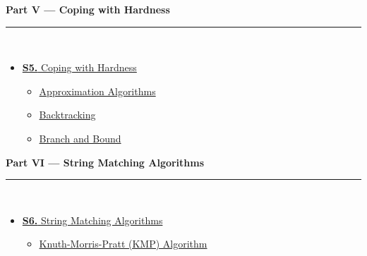 \documentclass[12pt,a3paper]{article}
\begin{document}
\begin{tcolorbox}[breakable,colback=cE!5,colframe=cE,boxrule=1pt,arc=5pt,
  left=8pt,right=8pt,top=8pt,bottom=8pt,before skip=4pt]
  {\large\bfseries\textcolor{cE}{Part V --- Coping with Hardness}}\\[5pt]
  \textcolor{cE!40}{\rule{\textwidth}{0.4pt}}\\[3pt]
  \small\begin{itemize}[leftmargin=1.2em,itemsep=1pt,label={\textcolor{cE}{$\triangleright$}}]
    \item \hyperref[sec:S5]{\textbf{S5.} Coping with Hardness}
      \begin{itemize}[leftmargin=1.5em,itemsep=0pt,label={\textcolor{cE}{$\cdot$}}]
        \item \hyperref[sub:s5-approx]{Approximation Algorithms}
        \item \hyperref[sub:s5-backtrack]{Backtracking}
        \item \hyperref[sub:s5-branchbound]{Branch and Bound}
      \end{itemize}
  \end{itemize}
\end{tcolorbox}

\begin{tcolorbox}[breakable,colback=cF!5,colframe=cF,boxrule=1pt,arc=5pt,
  left=8pt,right=8pt,top=8pt,bottom=8pt,before skip=4pt]
  {\large\bfseries\textcolor{cF}{Part VI --- String Matching Algorithms}}\\[5pt]
  \textcolor{cF!40}{\rule{\textwidth}{0.4pt}}\\[3pt]
  \small\begin{itemize}[leftmargin=1.2em,itemsep=1pt,label={\textcolor{cF}{$\triangleright$}}]
    \item \hyperref[sec:S6]{\textbf{S6.} String Matching Algorithms}
      \begin{itemize}[leftmargin=1.5em,itemsep=0pt,label={\textcolor{cF}{$\cdot$}}]
        \item \hyperref[sub:s6-kmp]{Knuth-Morris-Pratt (KMP) Algorithm}
      \end{itemize}
  \end{itemize}
\end{tcolorbox}

\end{document}
